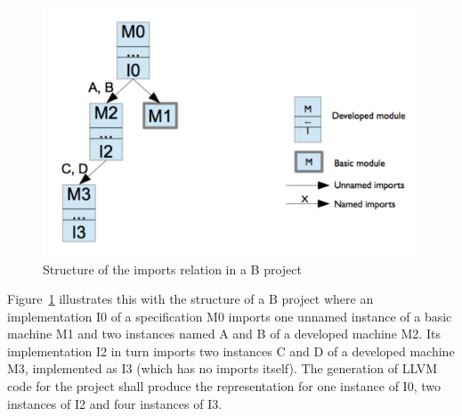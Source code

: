 \documentclass{llncs}
\newcommand{\B}[1]{\textsf{#1}}
\begin{document}
\begin{figure}
\begin{center}
\includegraphics[width=.8\textwidth]{b-project.pdf}
\caption{Structure of the imports relation in a B project}
\label{fig:structure}
\end{center}
\end{figure}
Figure~\ref{fig:structure} illustrates this with the structure of a B project
where an implementation \B{I0} of a specification \B{M0} imports one unnamed
instance of a basic machine \B{M1} and two instances named \B{A} and \B{B} of a
developed machine \B{M2}. Its implementation \B{I2} in turn imports two
instances \B{C} and \B{D} of a developed machine \B{M3}, implemented as \B{I3}
(which has no imports itself).  The generation of LLVM code for the project
shall produce the representation for one instance of \B{I0}, two instances of
\B{I2} and four instances of \B{I3}.
\end{document}
